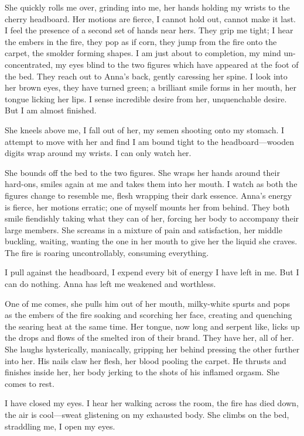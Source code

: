 She quickly rolls me over, grinding into me, her hands holding my wrists
to the cherry headboard. Her motions are fierce, I cannot hold out,
cannot make it last. I feel the presence of a second set of hands near
hers. They grip me tight; I hear the embers in the fire, they pop as if
corn, they jump from the fire onto the carpet, the smolder forming
shapes. I am just about to completion, my mind un-concentrated, my eyes
blind to the two figures which have appeared at the foot of the bed.
They reach out to Anna's back, gently caressing her spine. I look into
her brown eyes, they have turned green; a brilliant smile forms in her
mouth, her tongue licking her lips. I sense incredible desire from her,
unquenchable desire. But I am almost finished.

She kneels above me, I fall out of her, my semen shooting onto my
stomach. I attempt to move with her and find I am bound tight to the
headboard---wooden digits wrap around my wrists. I can only watch her.

She bounds off the bed to the two figures. She wraps her hands around
their hard-ons, smiles again at me and takes them into her mouth. I
watch as both the figures change to resemble me, flesh wrapping their
dark essence. Anna's energy is fierce, her motions erratic; one of
myself mounts her from behind. They both smile fiendishly taking what
they can of her, forcing her body to accompany their large members. She
screams in a mixture of pain and satisfaction, her middle buckling,
waiting, wanting the one in her mouth to give her the liquid she craves.
The fire is roaring uncontrollably, consuming everything.

I pull against the headboard, I expend every bit of energy I have left
in me. But I can do nothing. Anna has left me weakened and worthless.

One of me comes, she pulls him out of her mouth, milky-white spurts and
pops as the embers of the fire soaking and scorching her face, creating
and quenching the searing heat at the same time. Her tongue, now long
and serpent like, licks up the drops and flows of the smelted iron of
their brand. They have her, all of her. She laughs hysterically,
maniacally, gripping her behind pressing the other further into her. His
nails claw her flesh, her blood pooling the carpet. He thrusts and
finishes inside her, her body jerking to the shots of his inflamed
orgasm. She comes to rest.

I have closed my eyes. I hear her walking across the room, the fire has
died down, the air is cool---sweat glistening on my exhausted body. She
climbs on the bed, straddling me, I open my eyes.


